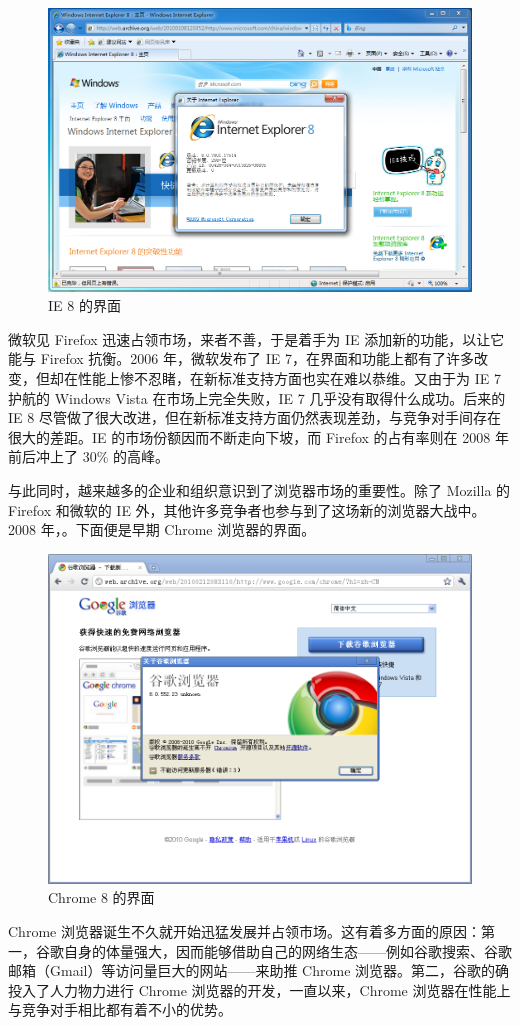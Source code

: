 \begin{figure}[htb!]
  \centering
  \includegraphics[width=.6\textwidth]{assets/software/IE8.png}
  \caption{IE 8 的界面}
  \label{fig:IE8}
\end{figure}

微软见 Firefox 迅速占领市场，来者不善，于是着手为 IE 添加新的功能，以让它能与 Firefox 抗衡。2006 年，微软发布了 IE 7，在界面和功能上都有了许多改变，但却在性能上惨不忍睹，在新标准支持方面也实在难以恭维。又由于为 IE 7 护航的 Windows Vista 在市场上完全失败，IE 7 几乎没有取得什么成功。后来的 IE 8 尽管做了很大改进，但在新标准支持方面仍然表现差劲，与竞争对手间存在很大的差距。IE 的市场份额因而不断走向下坡，而 Firefox 的占有率则在 2008 年前后冲上了 30\% 的高峰。

与此同时，越来越多的企业和组织意识到了浏览器市场的重要性。除了 Mozilla 的 Firefox 和微软的 IE 外，其他许多竞争者也参与到了这场新的浏览器大战中。2008 年，。下面便是早期 Chrome 浏览器的界面。

\begin{figure}[htb!]
  \centering
  \includegraphics[width=.6\textwidth]{assets/software/Chrome_8.png}
  \caption{Chrome 8 的界面}
  \label{fig:Chrome_8}
\end{figure}

Chrome 浏览器诞生不久就开始迅猛发展并占领市场。这有着多方面的原因：第一，谷歌自身的体量强大，因而能够借助自己的网络生态——例如谷歌搜索、谷歌邮箱（Gmail）等访问量巨大的网站——来助推 Chrome 浏览器。第二，谷歌的确投入了人力物力进行 Chrome 浏览器的开发，一直以来，Chrome 浏览器在性能上与竞争对手相比都有着不小的优势。


